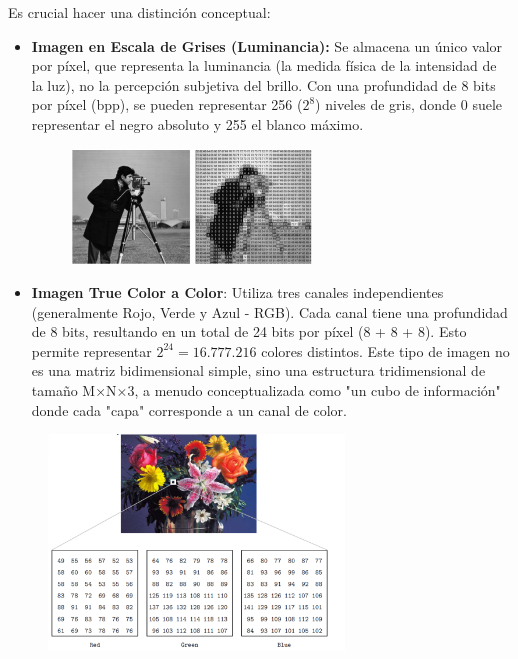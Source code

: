 Es crucial hacer una distinción conceptual:
\begin{itemize}
\item \textbf{Imagen en Escala de Grises (Luminancia):} Se almacena un único valor por píxel, que representa la luminancia (la medida física de la intensidad de la luz), no la percepción subjetiva del brillo. Con una profundidad de 8 bits por píxel (bpp), se pueden representar 256 ($2^8$) niveles de gris, donde 0 suele representar el negro absoluto y 255 el blanco máximo.
\begin{figure}[h]
\centering
\includegraphics[width = 0.6\textwidth]{figs/true-color-mono.png}
\end{figure}

\item \textbf{Imagen True Color a Color}: Utiliza tres canales independientes (generalmente Rojo, Verde y Azul - RGB). Cada canal tiene una profundidad de 8 bits, resultando en un total de 24 bits por píxel (8 + 8 + 8). Esto permite representar $2^24 = 16.777.216$ colores distintos. Este tipo de imagen no es una matriz bidimensional simple, sino una estructura tridimensional de tamaño M×N×3, a menudo conceptualizada como "un cubo de información" donde cada "capa" corresponde a un canal de color.
\end{itemize}
\begin{figure}[h]
\centering
\includegraphics[width = 0.7\textwidth]{figs/true-color-tri.png}
\end{figure}

